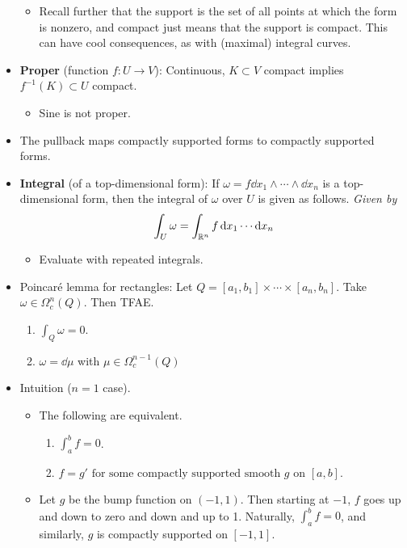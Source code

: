 \documentclass[../notes.tex]{subfiles}
\begin{document}
\begin{itemize}
    \begin{itemize}
        \item Recall further that the support is the set of all points at which the form is nonzero, and compact just means that the support is compact. This can have cool consequences, as with (maximal) integral curves.
    \end{itemize}
    \item \textbf{Proper} (function $f:U\to V$): Continuous, $K\subset V$ compact implies $f^{-1}(K)\subset U$ compact.
    \begin{itemize}
        \item Sine is not proper.
    \end{itemize}
    \item The pullback maps compactly supported forms to compactly supported forms.
    \item \textbf{Integral} (of a top-dimensional form): If $\omega=f\dd{x_1}\wedge\cdots\wedge\dd{x_n}$ is a top-dimensional form, then the integral of $\omega$ over $U$ is given as follows. \emph{Given by}
    \begin{equation*}
        \int_U\omega = \int_{\mathbb{R}^n}f\dd{x_1}\cdots\dd{x_n}
    \end{equation*}
    \begin{itemize}
        \item Evaluate with repeated integrals.
    \end{itemize}
    \item Poincar\'{e} lemma for rectangles: Let $Q=[a_1,b_1]\times\cdots\times[a_n,b_n]$. Take $\omega\in\Omega_c^n(Q)$. Then TFAE.
    \begin{enumerate}
        \item $\int_Q\omega=0$.
        \item $\omega=\dd\mu$ with $\mu\in\Omega_c^{n-1}(Q)$
    \end{enumerate}
    \item Intuition ($n=1$ case).
    \begin{itemize}
        \item The following are equivalent.
        \begin{enumerate}
            \item $\int_a^bf = 0$.
            \item $f = g'\text{ for some compactly supported smooth $g$ on $[a,b]$}$.
        \end{enumerate}
        \item Let $g$ be the bump function on $(-1,1)$. Then starting at $-1$, $f$ goes up and down to zero and down and up to 1. Naturally, $\int_a^bf=0$, and similarly, $g$ is compactly supported on $[-1,1]$.

\end{itemize}
\end{itemize}
\end{document}
